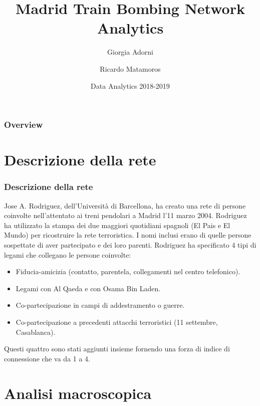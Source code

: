 \documentclass{beamer}
\title[Community Detection]{Madrid Train Bombing Network Analytics} %
\author[Adorni, Matamoros]{Giorgia Adorni \and Ricardo Matamoros}
\institute[]{\textit{g.adorni@campus.unimib.it \\ r.matamorosaragon@campus.unimib.it} \\
\bigskip Università degli Studi di Milano-Bicocca }
\date{Data Analytics 2018-2019}
\begin{document}
\begin{frame}
\titlepage
\end{frame}

\begin{frame}
\frametitle{Overview}
\tableofcontents
\end{frame}


\section{Descrizione della rete}

\begin{frame}
\frametitle{Descrizione della rete}
Jose A. Rodriguez, dell'Università di Barcellona, ha creato una rete di persone coinvolte nell'attentato ai treni pendolari a Madrid l'11 marzo 2004. Rodriguez ha utilizzato la stampa dei due maggiori quotidiani spagnoli (El Pais e El Mundo) per ricostruire la rete terroristica. I nomi inclusi erano di quelle persone sospettate di aver partecipato e dei loro parenti. Rodriguez ha specificato 4 tipi di legami che collegano le persone coinvolte:

\begin{itemize}
    \item Fiducia-amicizia (contatto, parentela, collegamenti nel centro telefonico).
    \item Legami con Al Qaeda e con Osama Bin Laden.
    \item Co-partecipazione in campi di addestramento o guerre.
    \item Co-partecipazione a precedenti attacchi terroristici (11 settembre, Casablanca).
\end{itemize}

Questi quattro sono stati aggiunti insieme fornendo una forza di indice di connessione che va da 1 a 4.
\end{frame}

\section{Analisi macroscopica}
\end{document}

